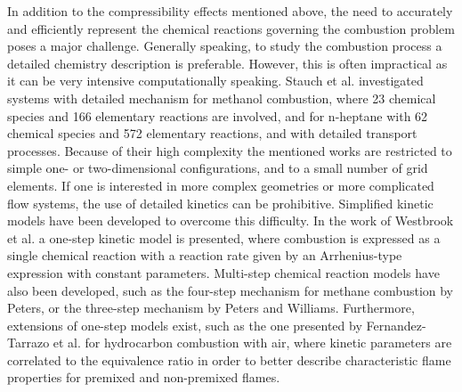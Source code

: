 In addition to the compressibility effects mentioned above, the need to accurately and efficiently represent the chemical reactions governing the combustion problem poses a major challenge. Generally speaking, to study the combustion process a detailed chemistry description is preferable. However, this is often impractical as it can be very intensive computationally speaking. Stauch et al. investigated systems with detailed mechanism for methanol combustion, where 23 chemical species and 166 elementary reactions are involved, \cite{stauchDetailedNumericalSimulation2006} and for n-heptane with 62 chemical species and 572 elementary reactions, and with detailed transport processes\cite{stauchAutoignitionSingleNheptane2007}. Because of their high complexity the mentioned works are restricted to simple one- or two-dimensional configurations, and to a small number of grid elements. If one is interested in more complex geometries or more complicated flow systems, the use of detailed kinetics can be prohibitive. Simplified kinetic models have been developed to overcome this difficulty. In the work of Westbrook et al. \cite{westbrookSimplifiedReactionMechanisms1981} a one-step kinetic model is presented, where combustion is expressed as a single chemical reaction with a reaction rate given by an Arrhenius-type expression with constant parameters. Multi-step chemical reaction models have also been developed, such as the four-step mechanism for methane combustion by Peters, \cite{petersNumericalAsymptoticAnalysis1985} or the three-step mechanism by Peters and Williams. \cite{petersAsymptoticStructureStoichiometric1987}
Furthermore, extensions of one-step models exist, such as the one presented by Fernandez-Tarrazo et al. \cite{fernandez-tarrazoSimpleOnestepChemistry2006} for hydrocarbon combustion with air, where kinetic parameters are correlated to the equivalence ratio in order to better describe characteristic flame properties for premixed and non-premixed flames.

